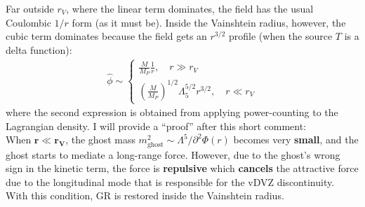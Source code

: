 \documentclass{book}
\theoremstyle{definition}
\newcommand{\p}{\partial}
\newcommand{\nn}{\nonumber}
\newcommand{\f}[2]{\frac{#1}{#2}}
\newcommand{\lp}{\left(}
\newcommand{\rp}{\right)}
\begin{document}
Far outside $r_V$, where the linear term dominates, the field has the usual Coulombic $1/r$ form (as it must be). Inside the Vainshtein radius, however, the cubic term dominates because the field gets an $r^{3/2}$ profile (when the source $T$ is a delta function):
\begin{align}
\hat\phi \sim \begin{cases}
\f{M}{M_P}\f{1}{r}, \quad r \gg r_V\nn\\
\lp \f{M}{M_P} \rp^{1/2} \Lambda_5^{5/2} r^{3/2}, \quad r \ll r_V
\end{cases}
\end{align} 
where the second expression is obtained from applying power-counting to the Lagrangian density. I will provide a ``proof'' after this short comment:\\

When $\mathbf{r \ll r_V}$, the ghost mass $m^2_\text{ghost} \sim \Lambda^5/\p^2\Phi(r)$ becomes very \textbf{small}, and the ghost starts to mediate a long-range force. However, due to the ghost's wrong sign in the kinetic term, the force is \textbf{repulsive} which \textbf{cancels} the attractive force due to the longitudinal mode that is responsible for the vDVZ discontinuity. With this condition, GR is restored inside the Vainshtein radius.\\
\end{document}
